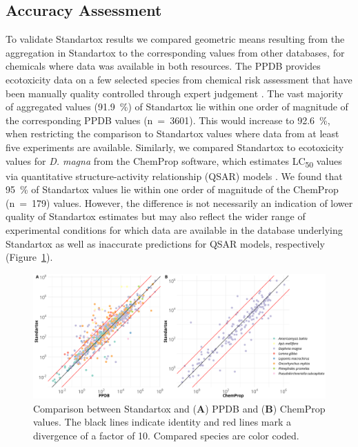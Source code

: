 \documentclass[journal,datadescriptor,submit,moreauthors,pdftex]{Definitions/mdpi}
\begin{document}
\subsection{Accuracy Assessment}
To validate Standartox results we compared geometric means resulting from the aggregation in Standartox to the corresponding values from other databases, for chemicals where data was available in both resources. The PPDB provides ecotoxicity data on a few selected species from chemical risk assessment that have been manually quality controlled through expert judgement \citep{lewis_international_2016}. The vast majority of aggregated values (91.9~\%) of Standartox lie within one order of magnitude of the corresponding PPDB values (n~=~3601). This would increase to 92.6~\%, when restricting the comparison to Standartox values where data from at least five experiments are available. Similarly, we compared Standartox to ecotoxicity values for \textit{D. magna} from the ChemProp \citep{ufzdepartmentofecologicalchemistry_chemprop_2019} software, which estimates LC\textsubscript{50} values via quantitative structure-activity relationship (QSAR) models \citep{schuurmann_quantitative_2011}. We found that 95~\% of Standartox values lie within one order of magnitude of the ChemProp (n~=~179) values. However, the difference is not necessarily an indication of lower quality of Standartox estimates but may also reflect the wider range of experimental conditions for which data are available in the database underlying Standartox as well as inaccurate predictions for QSAR models, respectively (Figure~\ref{fig:standartox_ppdb_diff}).

\begin{figure}[H]
    \centering
    \includegraphics[width=1\linewidth]{article/figures/gg_ppdb_stan_compare_continous.png}
    \caption{Comparison between Standartox and (\textbf{A}) PPDB and (\textbf{B}) ChemProp values. The black lines indicate identity and red lines mark a divergence of a factor of 10. Compared species are color coded.}
    \label{fig:standartox_ppdb_diff}
\end{figure}
\end{document}
